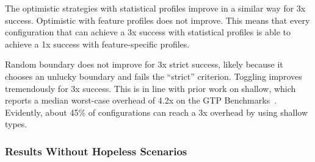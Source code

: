 The optimistic strategies with statistical profiles improve in a similar way
for 3x success.
Optimistic with feature profiles does not improve.
This means that every configuration that can achieve a 3x success with statistical
profiles is able to achieve a 1x success with feature-specific profiles.

Random boundary does not improve for 3x strict success, likely because it chooses
an unlucky boundary and fails the ``strict'' criterion.
Toggling improves tremendously for 3x success.
This is in line with prior work on shallow, which reports a median worst-case overhead
of 4.2x on the GTP Benchmarks~\cite{g-deep-shallow}.
Evidently, about 45\% of configurations can reach a 3x overhead by using shallow types.


\subsubsection{Results Without Hopeless Scenarios}



